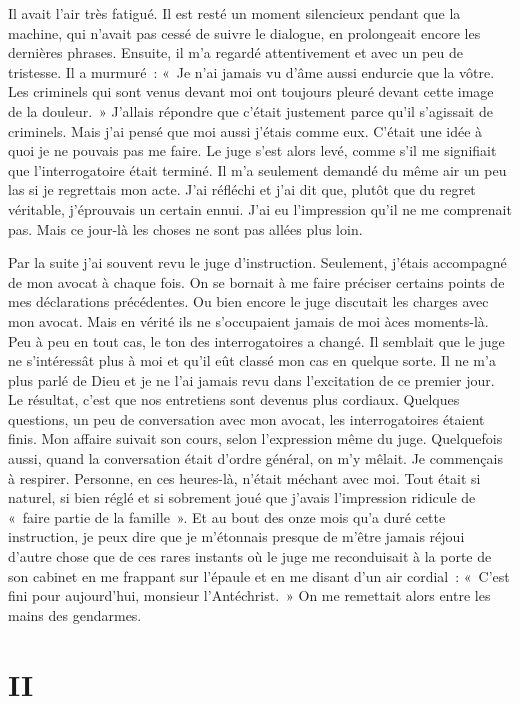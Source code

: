 \documentclass[french,twoside]{book} %
\newcommand\chapteropen{} %
\newcommand\chapterclose{} %
\begin{document}
Il avait l’air très fatigué. Il est resté un moment silencieux pendant que la machine, qui n’avait pas cessé de suivre le dialogue, en prolongeait encore les dernières phrases. Ensuite, il m’a regardé attentivement et avec un peu de tristesse. Il a murmuré : « Je n’ai jamais vu d’âme aussi endurcie que la vôtre. Les criminels qui sont venus devant moi ont toujours pleuré devant cette image de la douleur. » J'allais répondre que c’était justement parce qu’il s’agissait de criminels. Mais j’ai pensé que moi aussi j’étais comme eux. C'était une idée à quoi je ne pouvais pas me faire. Le juge s’est alors levé, comme s’il me signifiait que l’interrogatoire était terminé. Il m’a seulement demandé du même air un peu las si je regrettais mon acte. J'ai réfléchi et j’ai dit que, plutôt que du regret véritable, j’éprouvais un certain ennui. J'ai eu l’impression qu’il ne me comprenait pas. Mais ce jour-là les choses ne sont pas allées plus loin.\par
Par la suite j’ai souvent revu le juge d’instruction. Seulement, j’étais accompagné de mon avocat à chaque fois. On se bornait à me faire préciser certains points de mes déclarations précédentes. Ou bien encore le juge discutait les charges avec mon avocat. Mais en vérité ils ne s’occupaient jamais de moi àces moments-là. Peu à peu en tout cas, le ton des interrogatoires a changé. Il semblait que le juge ne s’intéressât plus à moi et qu’il eût classé mon cas en quelque sorte. Il ne m’a plus parlé de Dieu et je ne l’ai jamais revu dans l’excitation de ce premier jour. Le résultat, c’est que nos entretiens sont devenus plus cordiaux. Quelques questions, un peu de conversation avec mon avocat, les interrogatoires étaient finis. Mon affaire suivait son cours, selon l’expression même du juge. Quelquefois aussi, quand la conversation était d’ordre général, on m’y mêlait. Je commençais à respirer. Personne, en ces heures-là, n’était méchant avec moi. Tout était si naturel, si bien réglé et si sobrement joué que j’avais l’impression ridicule de « faire partie de la famille ». Et au bout des onze mois qu’a duré cette instruction, je peux dire que je m’étonnais presque de m’être jamais réjoui d’autre chose que de ces rares instants où le juge me reconduisait à la porte de son cabinet en me frappant sur l’épaule et en me disant d’un air cordial : « C'est fini pour aujourd’hui, monsieur l’Antéchrist. » On me remettait alors entre les mains des gendarmes.
\chapterclose


\chapteropen
\chapter[{II}]{II}
\label{II2}
\end{document}
